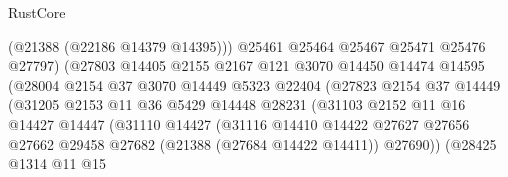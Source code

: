 \begin{lexlean}{RustCore}
\begin{coremodule}
                                    (@21388 (@22186 @14379 @14395)))
                                  @25461
                                  @25464
                                  @25467
                                  @25471
                                  @25476
                                  @27797)
                                (@27803
                                  @14405
                                  @2155
                                  @2167
                                  @121
                                  @3070
                                  @14450
                                  @14474
                                  @14595
                                  (@28004
                                    @2154
                                    @37
                                    @3070
                                    @14449
                                    @5323
                                    @22404
                                    (@27823
                                      @2154
                                      @37
                                      @14449
                                      (@31205
                                        @2153
                                        @11
                                        @36
                                        @5429
                                        @14448
                                        @28231
                                        (@31103
                                          @2152
                                          @11
                                          @16
                                          @14427
                                          @14447
                                          (@31110
                                            @14427
                                            (@31116
                                              @14410
                                              @14422
                                              @27627
                                              @27656
                                              @27662
                                              @29458
                                              @27682
                                              (@21388 (@27684 @14422 @14411))
                                              @27690))
                                          (@28425
                                            @1314
                                            @11
                                            @15

\end{coremodule}
\end{lexlean}
